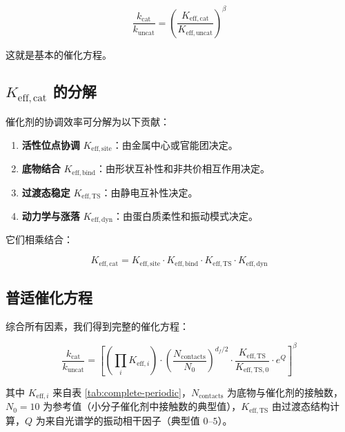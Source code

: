 \documentclass[11pt,a4paper]{article}
\newcommand{\df}{d_{\!f}}
\begin{document}
	\begin{equation}
		\frac{k_{\text{cat}}}{k_{\text{uncat}}} = \left(\frac{K_{\mathrm{eff},\text{cat}}}{K_{\mathrm{eff},\text{uncat}}}\right)^{\beta}
		\label{eq:cat-enhancement}
	\end{equation}
	
	这就是基本的催化方程。
	
	\subsection{\(K_{\mathrm{eff},\text{cat}}\) 的分解}
	
	催化剂的协调效率可分解为以下贡献：
	\begin{enumerate}
		\item \textbf{活性位点协调} \(K_{\mathrm{eff},\text{site}}\)：由金属中心或官能团决定。
		\item \textbf{底物结合} \(K_{\mathrm{eff},\text{bind}}\)：由形状互补性和非共价相互作用决定。
		\item \textbf{过渡态稳定} \(K_{\mathrm{eff},\text{TS}}\)：由静电互补性决定。
		\item \textbf{动力学与涨落} \(K_{\mathrm{eff},\text{dyn}}\)：由蛋白质柔性和振动模式决定。
	\end{enumerate}
	
	它们相乘结合：
	
	\begin{equation}
		K_{\mathrm{eff},\text{cat}} = K_{\mathrm{eff},\text{site}} \cdot K_{\mathrm{eff},\text{bind}} \cdot K_{\mathrm{eff},\text{TS}} \cdot K_{\mathrm{eff},\text{dyn}}
		\label{eq:keff-cat}
	\end{equation}
	
	\subsection{普适催化方程}
	
	综合所有因素，我们得到完整的催化方程：
	
	\begin{equation}
		\boxed{\frac{k_{\text{cat}}}{k_{\text{uncat}}} = \left[ \left(\prod_i K_{\mathrm{eff},i}\right) \cdot \left(\frac{N_{\text{contacts}}}{N_0}\right)^{\df/2} \cdot \frac{K_{\mathrm{eff},\text{TS}}}{K_{\mathrm{eff},\text{TS},0}} \cdot e^{Q} \right]^{\beta}}
		\label{eq:cat-universal}
	\end{equation}
	
	其中 \(K_{\mathrm{eff},i}\) 来自表 \ref{tab:complete-periodic}，\(N_{\text{contacts}}\) 为底物与催化剂的接触数，\(N_0 = 10\) 为参考值（小分子催化剂中接触数的典型值），\(K_{\mathrm{eff},\text{TS}}\) 由过渡态结构计算，\(Q\) 为来自光谱学的振动相干因子（典型值 \(0\)–\(5\)）。
	
\end{document}

